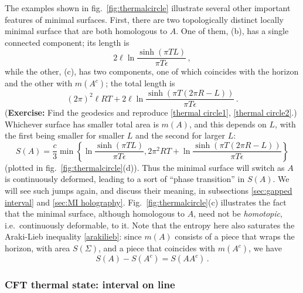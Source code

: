 \documentclass[11pt]{article}
\begin{document}
The examples shown in fig.\ \ref{fig:thermalcircle} illustrate several other important features of minimal surfaces. First, there are two topologically distinct locally minimal surface that are both homologous to $A$. One of them, (b), has a single connected component; its length is
\begin{equation}\label{thermal circle1}
2\ell\ln\frac{\sinh(\pi TL)}{\pi T\epsilon}\,,
\end{equation}
while the other, (c), has two components, one of which coincides with the horizon and the other with $m(A^c)$; the total length is
\begin{equation}\label{thermal circle2}
(2\pi)^2\ell RT + 2\ell\ln\frac{\sinh(\pi T(2\pi R-L))}{\pi T\epsilon}\,.
\end{equation}
({\bf Exercise:} Find the geodesics and reproduce \eqref{thermal circle1}, \eqref{thermal circle2}.) Whichever surface has smaller total area is $m(A)$, and this depends on $L$, with the first being smaller for smaller $L$ and the second for larger $L$:
\begin{equation}\label{thermal circle}
S(A) = \frac c3\min\left\{\ln\frac{\sinh(\pi TL)}{\pi T\epsilon},2\pi^2 RT + \ln\frac{\sinh(\pi T(2\pi R-L))}{\pi T\epsilon}\right\}
\end{equation}
(plotted in fig.\ \ref{fig:thermalcircle}(d)). Thus the minimal surface will switch as $A$ is continuously deformed, leading to a sort of ``phase transition'' in $S(A)$. We will see such jumps again, and discuss their meaning, in subsections \ref{sec:gapped interval} and \ref{sec:MI holography}. Fig.\ \ref{fig:thermalcircle}(c) illustrates the fact that the minimal surface, although homologous to $A$, need not be \emph{homotopic}, i.e.\ continuously deformable, to it. Note that the entropy here also saturates the Araki-Lieb inequality \eqref{arakilieb}: since $m(A)$ consists of a piece that wraps the horizon, with area $S(\Sigma)$, and a piece that coincides with $m(A^c)$, we have
\begin{equation}
S(A)-S(A^c) = S(AA^c)\,.
\end{equation}


\subsubsection{CFT thermal state: interval on line}
\end{document}
